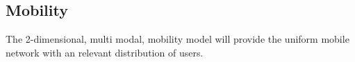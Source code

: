 \subsection{Mobility}
The 2-dimensional, multi modal, mobility model \cite{bettstetter2001smooth} will provide the uniform mobile network with an relevant distribution of users.